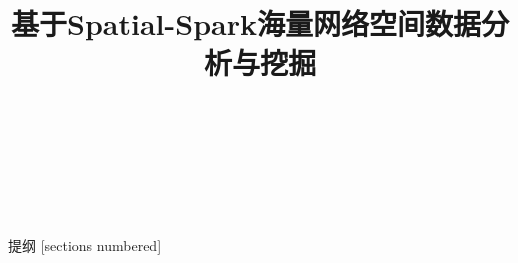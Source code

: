 \documentclass{beamer}
\title{基于Spatial-Spark海量网络空间数据分析与挖掘}
\author[高峰]{
    \makebox[2.5em][s]{姓名:} \makebox[3em][s]{高峰}\\
    \makebox[2.5em][s]{导师:} \makebox[3em][s]{高井祥} \\
    \makebox[2.5em][s]{} \makebox[3em]{孙久运} \\
    \makebox[2.5em][s]{专业:} \makebox[10em][l]{大地测量学与测量工程}\\
}
\date{}
\begin{document}
\maketitle

\begin{frame}{提纲}
  [sections numbered]
  \tableofcontents[hideallsubsections]
\end{frame}



        




\end{document}
